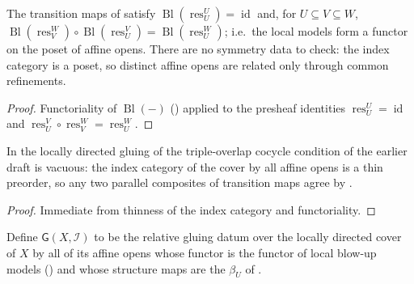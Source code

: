 \begin{lemma}
  \label{lemma:nagata-global-blowup-overlap-id-symm}
  \leanok

  The transition maps of 
  satisfy
  $\operatorname{Bl}(\operatorname{res}^U_U)=\operatorname{id}$ and, for
  $U\subseteq V\subseteq W$,
  $\operatorname{Bl}(\operatorname{res}^W_V)\circ
   \operatorname{Bl}(\operatorname{res}^V_U)
   =\operatorname{Bl}(\operatorname{res}^W_U)$;
  i.e.\ the local models form a functor on the poset of affine opens.
  There are no symmetry data to check: the index category is a poset, so
  distinct affine opens are related only through common refinements.
\end{lemma}

\begin{proof}
  \leanok
  Functoriality of $\operatorname{Bl}(-)$
  () applied to the
  presheaf identities
  $\operatorname{res}^U_U=\operatorname{id}$ and
  $\operatorname{res}^V_U\circ\operatorname{res}^W_V
    =\operatorname{res}^W_U$.
\end{proof}

\begin{lemma}
  \label{lemma:nagata-global-blowup-overlap-cocycle}
  \leanok

  In the locally directed gluing of
   the triple-overlap cocycle
  condition of the earlier draft is vacuous: the index category of the
  cover by all affine opens is a thin preorder, so any two parallel
  composites of transition maps agree by
  .
\end{lemma}

\begin{proof}
  \leanok
  Immediate from thinness of the index category and functoriality.
\end{proof}

\begin{definition}
  \label{def:nagata-global-blowup-glue-data}
  \leanok

  Define $\mathsf G(X,\mathcal I)$ to be the relative gluing datum over
  the locally directed cover of $X$ by all of its affine opens whose
  functor is the functor of local blow-up models
  () and whose structure maps
  are the $\beta_U$ of
  .
\end{definition}

